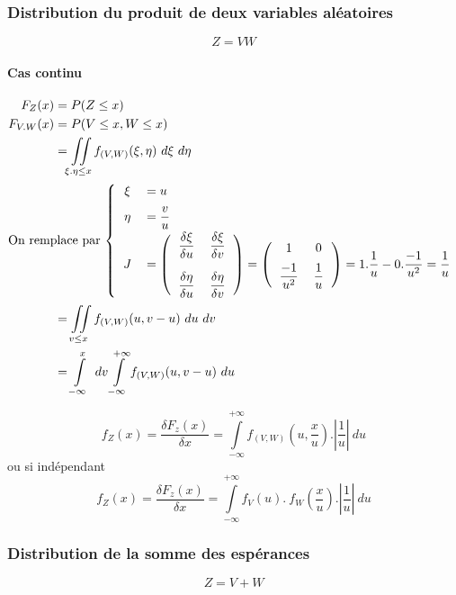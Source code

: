 \newpage
\subsubsection{Distribution du produit de deux variables aléatoires}
$$\boxed{Z = VW}$$

\paragraph{Cas continu}
\begin{align*}
	F_Z(x)     &= P(Z \leq x)\\
	F_{V.W}(x) &= P(V \leq x, W \leq x) \\
	           &= \iint\limits_{\xi . \eta\leq x} f_{(V,W)}(\xi,\eta)\ d\xi\ d\eta\\
	\intertext{On remplace par $\left\{
		\begin{tabular}{cl}
			$\xi$  & $= u$\\[0.2cm]
			$\eta$ & $= \dfrac{v}{u}$\\[0.2cm]
			$J$    & $= \left(\begin{tabular}{cc}$\dfrac{\delta\xi}{\delta u}$&$\dfrac{\delta \xi}{\delta v}$\\[0.5cm]$\dfrac{\delta\eta}{\delta u}$&$\dfrac{\delta\eta}{\delta v}$\end{tabular}\right) = \left(\begin{tabular}{cc}1&0\\[0.2cm]$\dfrac{-1}{u^2}$&$\dfrac{1}{u}$\end{tabular}\right) = 1.\dfrac{1}{u} - 0.\dfrac{-1}{u^2} = \dfrac{1}{u}$
		\end{tabular}
		\right.$}
	&= \iint\limits_{v\leq x} f_{(V,W)}(u,v-u)\ du\ dv\\
	&= \int\limits_{-\infty}^x\ dv \int\limits_{-\infty}^{+\infty} f_{(V,W)}(u,v-u)\ du
\end{align*}

$$\boxed{f_Z(x) = \frac{\delta F_z(x)}{\delta x} = \int\limits_{-\infty}^{+\infty} f_{(V,W)}\left(u,\dfrac{x}{u}\right).\left|\dfrac{1}{u}\right|\ du }$$
ou si indépendant
$$\boxed{f_Z(x) = \frac{\delta F_z(x)}{\delta x} = \int\limits_{-\infty}^{+\infty} f_V\left(u\right).\ f_W\left(\dfrac{x}{u}\right).\left|\dfrac{1}{u}\right|\ du }$$







\newpage
\subsubsection{Distribution de la somme des espérances}
$$\boxed{Z = V+W}$$

